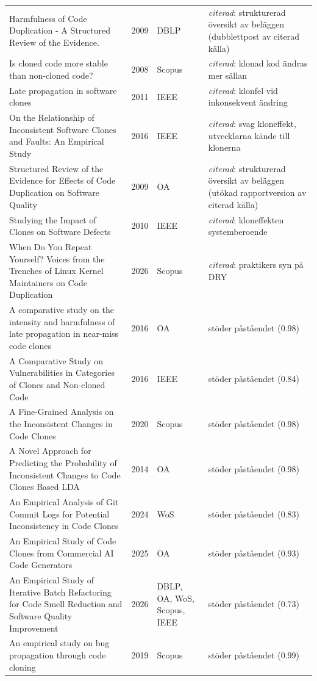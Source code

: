 \begin{longtable}{@{}%
  >{\raggedright\arraybackslash}p{}c%
  >{\raggedright\arraybackslash}p{}%
  >{\raggedright\arraybackslash}p{}@{}}
Harmfulness of Code Duplication - A Structured Review of the Evidence. & 2009 & DBLP & \emph{citerad}: strukturerad översikt av beläggen (dubblettpost av citerad källa) \\
Is cloned code more stable than non-cloned code? & 2008 & Scopus & \emph{citerad}: klonad kod ändras mer sällan \\
Late propagation in software clones & 2011 & IEEE & \emph{citerad}: klonfel vid inkonsekvent ändring \\
On the Relationship of Inconsistent Software Clones and Faults: An Empirical Study & 2016 & IEEE & \emph{citerad}: svag kloneffekt, utvecklarna kände till klonerna \\
Structured Review of the Evidence for Effects of Code Duplication on Software Quality & 2009 & OA & \emph{citerad}: strukturerad översikt av beläggen (utökad rapportversion av citerad källa) \\
Studying the Impact of Clones on Software Defects & 2010 & IEEE & \emph{citerad}: kloneffekten systemberoende \\
When Do You Repeat Yourself? Voices from the Trenches of Linux Kernel Maintainers on Code Duplication & 2026 & Scopus & \emph{citerad}: praktikers syn på DRY \\
A comparative study on the intensity and harmfulness of late propagation in near-miss code clones & 2016 & OA & stöder påståendet (0.98) \\
A Comparative Study on Vulnerabilities in Categories of Clones and Non-cloned Code & 2016 & IEEE & stöder påståendet (0.84) \\
A Fine-Grained Analysis on the Inconsistent Changes in Code Clones & 2020 & Scopus & stöder påståendet (0.98) \\
A Novel Approach for Predicting the Probability of Inconsistent Changes to Code Clones Based LDA & 2014 & OA & stöder påståendet (0.98) \\
An Empirical Analysis of Git Commit Logs for Potential Inconsistency in Code Clones & 2024 & WoS & stöder påståendet (0.83) \\
An Empirical Study of Code Clones from Commercial AI Code Generators & 2025 & OA & stöder påståendet (0.93) \\
An Empirical Study of Iterative Batch Refactoring for Code Smell Reduction and Software Quality Improvement & 2026 & DBLP, OA, WoS, Scopus, IEEE & stöder påståendet (0.73) \\
An empirical study on bug propagation through code cloning & 2019 & Scopus & stöder påståendet (0.99) \\

\end{longtable}

